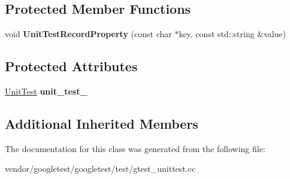 \subsection*{Protected Member Functions}
\begin{DoxyCompactItemize}
\item 
\mbox{\label{classtesting_1_1internal_1_1_unit_test_record_property_test_helper_a9c5432d080faf13a1db6baff0a2944f4}} 
void {\bfseries Unit\+Test\+Record\+Property} (const char $\ast$key, const std\+::string \&value)
\end{DoxyCompactItemize}
\subsection*{Protected Attributes}
\begin{DoxyCompactItemize}
\item 
\mbox{\label{classtesting_1_1internal_1_1_unit_test_record_property_test_helper_a415e13a354d3b8bd97db96aae5ef5df1}} 
\mbox{\hyperlink{classtesting_1_1_unit_test}{Unit\+Test}} {\bfseries unit\+\_\+test\+\_\+}
\end{DoxyCompactItemize}
\subsection*{Additional Inherited Members}


The documentation for this class was generated from the following file\+:\begin{DoxyCompactItemize}
\item 
vendor/googletest/googletest/test/gtest\+\_\+unittest.\+cc\end{DoxyCompactItemize}
